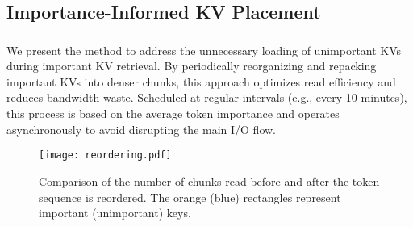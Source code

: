 \subsection{Importance-Informed KV Placement}
\label{sec:techb}

\subsubsection{\techBa{}}
\label{sec:techba}


We present the \techba{} method to address the unnecessary loading of unimportant KVs during important KV retrieval. By periodically reorganizing and repacking important KVs into denser chunks, this approach optimizes read efficiency and reduces bandwidth waste.
Scheduled at regular intervals (e.g., every 10 minutes), this process is based on the average token importance and operates asynchronously to avoid disrupting the main I/O flow.


\begin{figure}
	\centering
	\texttt{[image: reordering.pdf]}
	\caption{Comparison of the number of chunks read before and after the token sequence is reordered. The orange (blue) rectangles represent important (unimportant) keys.}
	\label{fig:reordering}
	\vspace{-0.1in}
\end{figure}

